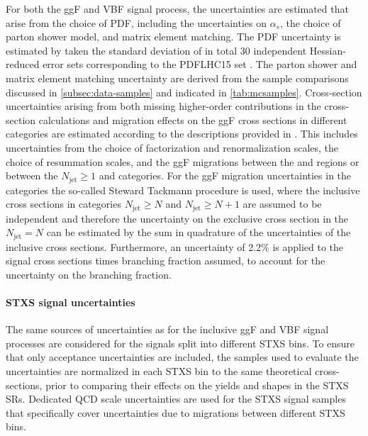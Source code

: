 For both the ggF and VBF signal process, the uncertainties are estimated that arise from the choice of PDF, including the uncertainties on $\alpha_s$, the choice of parton shower model, and matrix element matching.
The PDF uncertainty is estimated by taken the standard deviation of in total 30 independent Hessian-reduced error sets corresponding to the PDFLHC15 set \cite{Butterworth:2015oua}. 
The parton shower and matrix element matching uncertainty are derived from the sample comparisons discussed in \cref{subsec:data-samples} and indicated in \cref{tab:mcsamples}.
Cross-section uncertainties arising from both missing higher-order contributions in the cross-section calculations and migration effects on the ggF cross sections in different \Njets categories are estimated according to the descriptions provided in .
This includes uncertainties from the choice of factorization and renormalization scales, the choice of resummation scales, and the ggF migrations between the \ZeroJet and \OneJet regions or between the $N_{\text{jet}} \ge 1$  and \TwoJet categories.
For the ggF migration uncertainties in the \TwoJet categories the so-called Steward Tackmann procedure is used, where the inclusive cross sections in categories $N_{\text{jet}} \ge N$ and $N_{\text{jet}} \ge N+1$ are assumed to be independent and therefore the uncertainty on the exclusive cross section in the $N_{\text{jet}} = N$ can be estimated by the sum in quadrature of the uncertainties of the inclusive cross sections.
Furthermore, an uncertainty of 2.2\% is applied to the signal cross sections times branching fraction assumed, to account for the uncertainty on the \HWW branching fraction. 

\paragraph{STXS signal uncertainties}
The same sources of uncertainties as for the inclusive ggF and VBF signal processes are considered for the signals split into different STXS bins. 
To ensure that only acceptance uncertainties are included, the samples used to evaluate the uncertainties are normalized in each STXS bin to the same theoretical cross-sections, prior to comparing their effects on the yields and shapes in the STXS SRs. 
Dedicated QCD scale uncertainties are used for the STXS signal samples that specifically cover uncertainties due to migrations between different STXS bins. 

